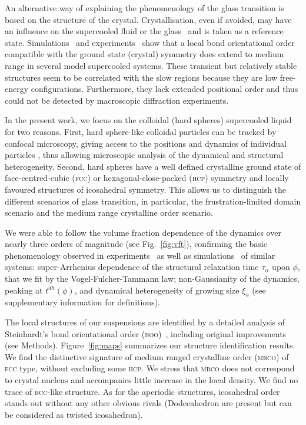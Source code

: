 An alternative way of explaining the phenomenology of the glass transition is based on the structure of the crystal. Crystallisation, even if avoided, may have an influence on the supercooled fluid or the glass~\citep{TanakaGJPCM, Cavagna2003} and is taken as a reference state. Simulations~\cite{tanaka2010critical, Pedersen2010, Coslovich2011} and experiments~\citep{tanaka2010critical} show that a local bond orientational order compatible with the ground state (crystal) symmetry does extend to medium range in several model supercooled systems. These transient but relatively stable structures seem to be correlated with the slow regions because they are low free-energy configurations. Furthermore, they lack extended positional order and thus could not be detected by macroscopic diffraction experiments.

In the present work, we focus on the colloidal (hard spheres) supercooled liquid \cite{pusey1987ogt} for two reasons. First, hard sphere-like colloidal particles can be tracked by confocal microscopy, giving access to the positions and dynamics of individual particles \cite{kegel2000swe, weeks2000}, thus allowing microscopic analysis of the dynamical and structural heterogeneity. Second, hard spheres have a well defined crystalline ground state of face-centred-cubic (\textsc{fcc}) or hexagonal-close-packed (\textsc{hcp}) symmetry and locally favoured structures of icosahedral symmetry. This allows us to distinguish the different scenarios of glass transition, in particular, the frustration-limited domain scenario and the medium range crystalline order scenario.



We were able to follow the volume fraction dependence of the dynamics over nearly three orders of magnitude (see Fig.~\ref{fig:vft}), confirming the basic phenomenology observed in experiments~\citep{pusey1987ogt, kegel2000swe, weeks2000, BerthierR} as well as simulations~\citep{tanaka2010critical} of similar systems: super-Arrhenius dependence of the structural relaxation time $\tau_\alpha$ upon $\phi$, that we fit by the Vogel-Fulcher-Tammann law; non-Gaussianity of the dynamics, peaking at $t^{dh}(\phi)$, and dynamical heterogeneity of growing size $\xi_u$ (see supplementary information for definitions).



The local structures of our suspensions are identified by a detailed analysis of Steinhardt's bond orientational order (\textsc{boo})~\citep{steinhardt1983boo}, including original improvements (see Methods). Figure~\ref{fig:maps} summarizes our structure identification results. We find the distinctive signature of medium ranged crystalline order (\textsc{mrco}) of \textsc{fcc} type, without excluding some \textsc{hcp}. We stress that \textsc{mrco} does not correspond to crystal nucleus and accompanies little increase in the local density. We find no trace of \textsc{bcc}-like structure. As for the aperiodic structures, icosahedral order stands out without any other obvious rivals (Dodecahedron are present but can be considered as twisted icosahedron).



